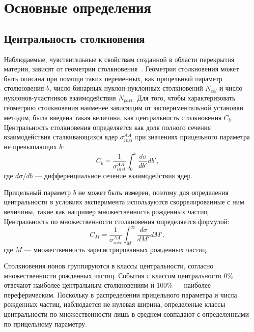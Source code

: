 \section{Основные определения}

\subsection{Центральность столкновения}
\label{theory:centrality}
Наблюдаемые, чувствительные к свойствам созданной в области перекрытия материи, зависят от геометрии столкновения~\cite{ALICE:2010mlf,ALICE:2015juo}.
Геометрия столкновения может быть описана при помощи таких переменных, как прицельный параметр столкновения $b$, число бинарных нуклон-нуклонных столкновений $N_{col}$ и число нуклонов-участников взаимодействия $N_{part}$.
Для того, чтобы характеризовать геометрию столкновения наименее зависящим от экспериментальной установки методом, была введена такая величина, как центральность столкновения $C_b$.
Центральность столкновения определяется как доля полного сечения взаимодействия сталкивающихся ядер $\sigma_{inel}^{AA}$ при значениях прицельного параметра не превышающих $b$:
\begin{equation}
    C_b = \frac{1}{\sigma_{inel}^{AA}} \int_{0}^{b} \frac{d\sigma}{db'}db',
\end{equation}
где $d\sigma/db$ --- дифференциальное сечение взаимодействия ядер.

Прицельный параметр $b$ не может быть измерен, поэтому для определения центральности в условиях эксперимента используются скоррелированные с ним величины, такие как например множественность рожденных частиц~\cite{Segal:2020ftt,HADES:2017def}.
Центральность по множественности столкновения определяется формулой:
\begin{equation}
    C_M = \frac{1}{\sigma_{inel}^{AA}} \int_{M}^{\infty} \frac{d\sigma}{dM'}dM',
\end{equation}
где $M$ --- множественность зарегистрированных рожденных частиц.

Столкновения ионов группируются в классы центральности, согласно множественности рожденных частиц.
События с классом центральности 0\% отвечают наиболее центральным столкновениям и 100\% --- наиболее переферическим.
Поскольку в распределении прицельного параметра и числа рожденных частиц, наблюдается не нулевая ширина, определеные классы центральности по множественности лишь в среднем совпадают с определенными по прицельному параметру.

